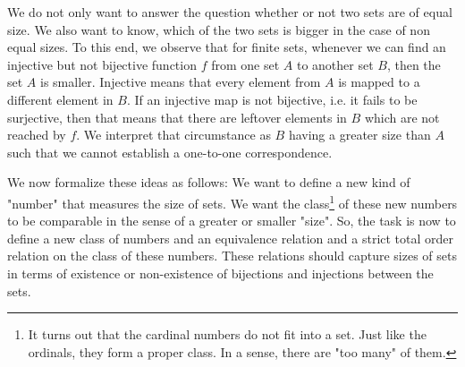\medskip
We do not only want to answer the question whether or not two sets are of equal size. We also want to know, which of the two sets is bigger in the case of non equal sizes. To this end, we observe that for finite sets, whenever we can find an injective but not bijective function $f$ from one set $A$ to another set $B$, then the set $A$ is smaller. Injective means that every element from $A$ is mapped to a different element in $B$. If an injective map is not bijective, i.e. it fails to be surjective, then that means that there are leftover elements in $B$ which are not reached by $f$. We interpret that circumstance as $B$ having a greater size than $A$ such that we cannot establish a one-to-one correspondence. 

\medskip
We now formalize these ideas as follows: We want to define a new kind of "number" that measures the size of sets. We want the class\footnote{It turns out that the cardinal numbers do not fit into a set. Just like the ordinals, they form a proper class. In a sense, there are "too many" of them. } of these new numbers to be comparable in the sense of a greater or smaller "size". So, the task is now to define a new class of numbers and an equivalence relation and a strict total order relation on the class of these numbers. These relations should capture sizes of sets in terms of existence or non-existence of bijections and injections between the sets.

